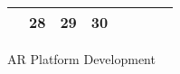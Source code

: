 {\begin{tabularx}{\linewidth}{|l!{\vrule width \myLenLineThicknessThick}*{7}{@{}X@{}|}}
       & 
    
      
      
        \begin{minipage}[t]{6mm}\centering{}28\end{minipage}
      
       & 
    
      
      
        \begin{minipage}[t]{6mm}\centering{}29\end{minipage}
      
       & 
    
      
      
        \begin{minipage}[t]{6mm}\centering{}30\end{minipage}
      
       & 
    
      
      
       & 
    
      
      
       & 
    
      
      
      
        \\  \hline 
      
    
  
  
  \end{tabularx}
}
\vfill{\centering{} \small{AR Platform Development}\hspace{1.5em}\par}

